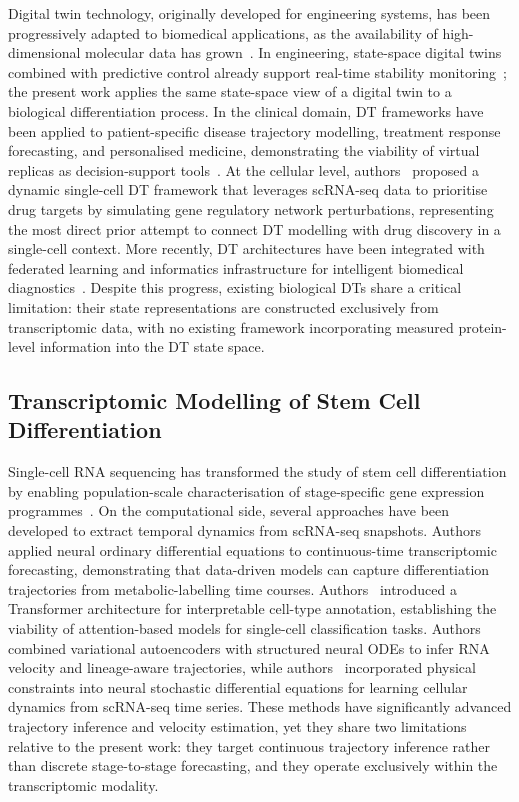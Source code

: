 \documentclass[5p,times,twocolumn]{elsarticle}
\newcommand{\rtag}[1]{}
\newcommand{\rev}[2]{\rtag{#1}#2}
\newcommand{\lang}[1]{#1}
\begin{document}
Digital twin technology, originally developed for
engineering systems, has been progressively adapted
to biomedical applications, as the availability of
high-dimensional molecular data has
grown~\cite{masison2021modular}.
\rev{R1.16}{In engineering, state-space digital twins combined
  with predictive control already support real-time stability
  monitoring~\cite{pandey2026statespace}; the present work
  applies the same state-space view of a digital twin to a
  biological differentiation process.}
In the clinical domain, DT frameworks have been
applied to patient-specific disease trajectory
modelling, treatment response forecasting, and
personalised medicine, demonstrating the viability
of virtual replicas as decision-support
tools~\cite{hansen2024transcriptomics}.
At the cellular level, authors~\cite{li2022dynamic}
proposed a dynamic single-cell DT framework
that leverages scRNA-seq data to prioritise
drug targets by simulating gene regulatory
network perturbations, representing the most
direct prior attempt to connect DT modelling
with drug discovery in a single-cell context.
More recently, DT architectures have been
integrated with federated learning and
informatics infrastructure for intelligent
biomedical diagnostics~\cite{qu2023dtqfl}.
Despite this progress, existing biological DTs
share a critical limitation: their state
representations are constructed exclusively from
transcriptomic data, with no existing framework
incorporating measured protein-level information
into the DT state space.

\subsection{\textbf{Transcriptomic Modelling of Stem Cell
    Differentiation}}

Single-cell RNA sequencing has transformed the
study of stem cell differentiation by enabling
population-scale characterisation of stage-specific
gene expression \lang{programmes}~\cite{jerber2021population}.
On the computational side, several approaches have
been developed to extract temporal dynamics from
scRNA-seq snapshots.
Authors~\cite{erbe2023transcriptomic} applied neural ordinary
differential equations to continuous-time
transcriptomic forecasting, demonstrating that
data-driven models can capture differentiation
trajectories from metabolic-labelling time courses.
Authors~\cite{chen2023transformer} introduced
a Transformer architecture for interpretable
cell-type annotation, establishing the viability
of attention-based models for single-cell
classification tasks.
Authors~\cite{farrell2023inferring} combined
variational autoencoders with structured neural
ODEs to infer RNA velocity and lineage-aware
trajectories, while authors~\cite{jiang2024physics}
incorporated physical constraints into neural
stochastic differential equations for learning
cellular dynamics from scRNA-seq time series.
These methods have significantly advanced
trajectory inference and velocity estimation,
yet they share two limitations relative to the
present work: they target \lang{continuous trajectory
  inference rather than discrete stage-to-stage
  forecasting}, and they operate exclusively within
the transcriptomic modality.
\end{document}
